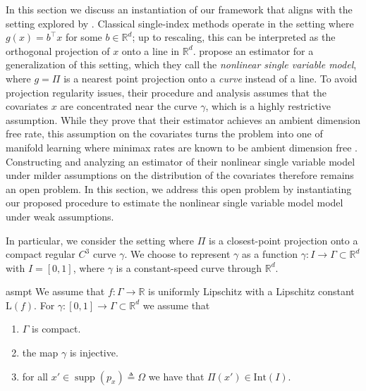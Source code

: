 \documentclass[11pt]{article}
\begin{document}
In this section we discuss an instantiation of our framework that aligns with the setting explored by \citet{wu2024conditional}. Classical single-index methods operate in the setting where $g(x) = b^{\top}x$ for some $b \in \mathbb{R}^d$; up to rescaling, this can be interpreted as the orthogonal projection of $x$ onto a line in $\mathbb{R}^d$. \citet{wu2024conditional} propose an estimator for a generalization of this setting, which they call the \textit{nonlinear single variable model}, where $g = \Pi$ is a nearest point projection onto a \textit{curve} instead of a line. To avoid projection regularity issues, their procedure and analysis assumes that the covariates $x$ are concentrated near the curve $\gamma$, which is a highly restrictive assumption. While they prove that their estimator achieves an ambient dimension free rate, this assumption on the covariates turns the problem into one of manifold learning where minimax rates are known to be ambient dimension free \cite{genovese2012minimax}. Constructing and analyzing an estimator of their nonlinear single variable model under milder assumptions on the distribution of the covariates therefore remains an open problem. In this section, we address this open problem by instantiating our proposed procedure to estimate the nonlinear single variable model model under weak assumptions.

In particular, we consider the setting where $\Pi$ is a closest-point projection onto a compact regular $C^3$ curve $\gamma$. We choose to represent $\gamma$ as a function $\gamma:I \rightarrow \Gamma \subset \mathbb{R}^d$ with $I = [0, 1]$, where $\gamma$ is a constant-speed curve through $\mathbb{R}^d$.
\begin{restatable}{asmpt}{} \label{assumption: the curve gamma}
    We assume that $f: \Gamma \rightarrow \mathbb{R}$ is uniformly Lipschitz with a Lipschitz constant $\text{L}(f)$. For $\gamma: [0, 1]\rightarrow \Gamma \subset \mathbb{R}^d$ we assume that
    \begin{enumerate}
        \item $\Gamma$ is compact.
        \item the map $\gamma$ is injective.
        \item for all $x' \in \operatorname{supp}(p_x) \triangleq \Omega$ we have that $\Pi(x') \in \text{Int}(I)$.
    \end{enumerate}
\end{restatable}
\end{document}
